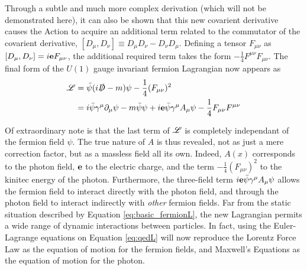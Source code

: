     Through a subtle and much more complex derivation (which will not be demonstrated here),
        it can also be shown that this new covarient derivative causes the Action to acquire an additional term 
        related to the commutator of the covarient derivative, $[D_\mu, D_\nu] \equiv D_\mu D_\nu - D_\nu D_\mu$.
    Defining a tensor $F_{\mu\nu}$ as $[D_\mu, D_\nu] = i\mathbf{e} F_{\mu\nu}$,
        the additional required term takes the form $-\frac{1}{4}F^{\mu\nu}F_{\mu\nu}$.
    The final form of the $U(1)$ gauge invariant fermion Lagrangian now appears as
    \begin{equation} \label{eq:qedL} \begin{split}
        \mathscr{L} &= \bar{\psi} (i\slashed{D} - m) \psi - \frac{1}{4}(F_{\mu\nu})^2
        \\&= i \bar{\psi} \gamma^\mu \partial_\mu \psi
            - m \bar{\psi} \psi
            + i \mathbf{e} \bar{\psi} \gamma^\mu A_\mu \psi
            - \frac{1}{4}F_{\mu\nu}F^{\mu\nu}
    \end{split} \end{equation}

    Of extraordinary note is that the last term of $\mathscr{L}$ is completely independant of the fermion field $\psi$.
    The true nature of $A$ is thus revealed, not as just a mere correction factor,
        but as a massless field all its own.
    Indeed, $A(x)$ corresponds to the photon field, $\mathbf{e}$ to the electric charge,
        and the term $-\frac{1}{4}(F_{\mu\nu})^2$ to the kinitec energy of the photon.
    Furthermore, the three-field term $i \mathbf{e} \bar{\psi} \gamma^\mu A_\mu \psi$
        allows the fermion field to interact directly with the photon field,
        and through the photon field to interact indirectly with \textit{other} fermion fields.
    Far from the static situation described by Equation \ref{eq:basic_fermionL},
        the new Lagrangian permits a wide range of dynamic interactions between particles.
    In fact, using the Euler-Lagrange equations on Equation \ref{eq:qedL}
        will now reproduce the Lorentz Force Law as the equation of motion for the fermion fields,
        and Maxwell's Equations as the equation of motion for the photon.

